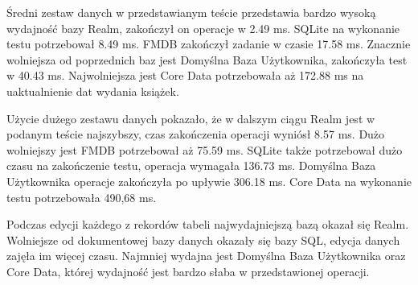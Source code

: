 Średni zestaw danych w przedstawianym teście przedstawia bardzo wysoką wydajność bazy Realm, zakończył on operacje w 2.49 ms. SQLite na wykonanie testu potrzebował 8.49 ms. FMDB zakończył zadanie w czasie 17.58 ms. Znacznie wolniejsza od poprzednich baz jest Domyślna Baza Użytkownika, zakończyła test w 40.43 ms. Najwolniejsza jest Core Data potrzebowała aż 172.88  ms na uaktualnienie dat wydania książek.

Użycie dużego zestawu danych pokazało, że w dalszym ciągu Realm jest w podanym teście najszybszy, czas zakończenia operacji wyniósł 8.57 ms. Dużo wolniejszy jest FMDB potrzebował aż 75.59 ms. SQLite także potrzebował dużo czasu na zakończenie testu, operacja wymagała 136.73 ms. Domyślna Baza Użytkownika operacje zakończyła po upływie 306.18 ms. Core Data na wykonanie testu potrzebowała 490,68 ms. 

Podczas edycji każdego z rekordów tabeli najwydajniejszą bazą okazał się Realm. Wolniejsze od dokumentowej bazy danych okazały się bazy SQL, edycja danych zajęła im więcej czasu. Najmniej wydajna jest Domyślna Baza Użytkownika oraz Core Data, której wydajność jest bardzo słaba w przedstawionej operacji. 

